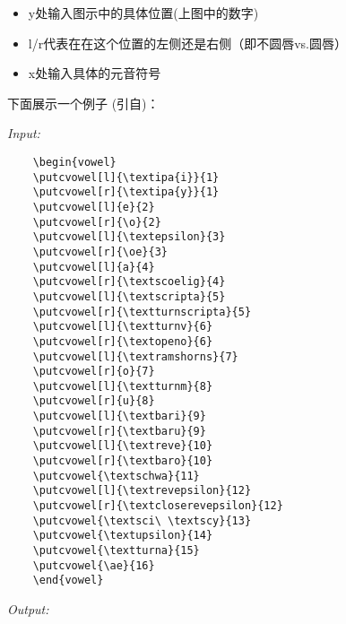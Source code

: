 \documentclass[a4paper,12pt]{article}
\begin{document}
\begin{itemize}
	\item y处输入图示中的具体位置(上图中的数字)
	\item l/r代表在在这个位置的左侧还是右侧（即不圆唇vs.圆唇）
	\item x处输入具体的元音符号
\end{itemize}

下面展示一个例子 (引自)：

\vspace{5mm}
\textit{Input:}
\begin{verbatim}
	\begin{vowel}
	\putcvowel[l]{\textipa{i}}{1}
	\putcvowel[r]{\textipa{y}}{1}
	\putcvowel[l]{e}{2}
	\putcvowel[r]{\o}{2}
	\putcvowel[l]{\textepsilon}{3}
	\putcvowel[r]{\oe}{3}
	\putcvowel[l]{a}{4}
	\putcvowel[r]{\textscoelig}{4}
	\putcvowel[l]{\textscripta}{5}
	\putcvowel[r]{\textturnscripta}{5}
	\putcvowel[l]{\textturnv}{6}
	\putcvowel[r]{\textopeno}{6}
	\putcvowel[l]{\textramshorns}{7}
	\putcvowel[r]{o}{7}
	\putcvowel[l]{\textturnm}{8}
	\putcvowel[r]{u}{8}
	\putcvowel[l]{\textbari}{9}
	\putcvowel[r]{\textbaru}{9}
	\putcvowel[l]{\textreve}{10}
	\putcvowel[r]{\textbaro}{10}
	\putcvowel{\textschwa}{11}
	\putcvowel[l]{\textrevepsilon}{12}
	\putcvowel[r]{\textcloserevepsilon}{12}
	\putcvowel{\textsci\ \textscy}{13}
	\putcvowel{\textupsilon}{14}
	\putcvowel{\textturna}{15}
	\putcvowel{\ae}{16}
	\end{vowel}
\end{verbatim}

\vspace{5mm}
\textit{Output:}
\begin{center}
	\begin{vowel}
	\end{vowel}
\end{center}
\end{document}
